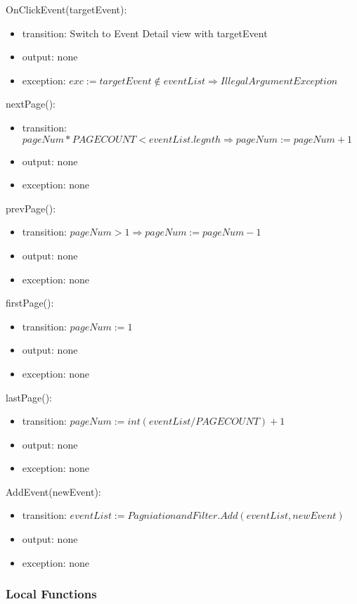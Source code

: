 \documentclass[12pt, titlepage]{article}
\begin{document}
\noindent OnClickEvent(targetEvent):
\begin{itemize}
\item transition: Switch to Event Detail view with targetEvent
\item output: none
\item exception: $exc := targetEvent \notin eventList \Rightarrow IllegalArgument Exception$
\end{itemize}

\noindent nextPage():
\begin{itemize}
\item transition: $pageNum * PAGECOUNT < eventList.legnth \Rightarrow pageNum := pageNum + 1$
\item output: none
\item exception: none
\end{itemize}

\noindent prevPage():
\begin{itemize}
\item transition: $pageNum > 1 \Rightarrow pageNum := pageNum - 1$
\item output: none
\item exception: none
\end{itemize}

\noindent firstPage():
\begin{itemize}
\item transition: $pageNum := 1$
\item output: none
\item exception: none
\end{itemize}

\noindent lastPage():
\begin{itemize}
\item transition: $pageNum := int(eventList/PAGECOUNT) + 1$
\item output: none
\item exception: none
\end{itemize}

\noindent AddEvent(newEvent):
\begin{itemize}
\item transition: $eventList := PagniationandFilter.Add(eventList, newEvent)$
\item output: none
\item exception: none
\end{itemize}
\subsubsection{Local Functions}
\end{document}
